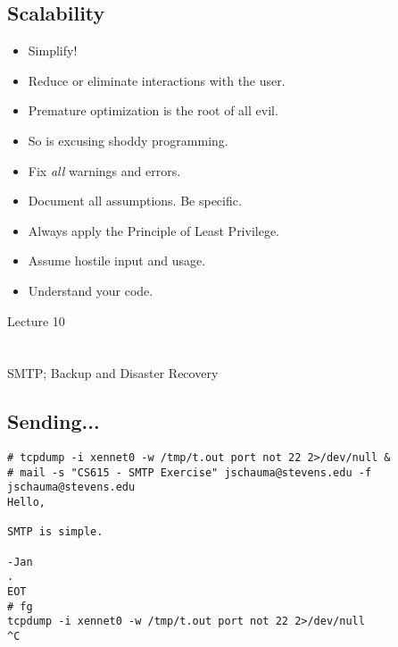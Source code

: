 \documentclass[xga]{xdvislides}
\begin{document}
\subsection{Scalability}
\begin{itemize}
	\item Simplify!
	\item Reduce or eliminate interactions with the user.
	\item Premature optimization is the root of all evil.
	\item So is excusing shoddy programming.
	\item Fix {\em all} warnings and errors.
	\item Document all assumptions.  Be specific.
	\item Always apply the Principle of Least Privilege.
	\item Assume hostile input and usage.
	\item Understand your code.
\end{itemize}


\newpage
\vspace*{\fill}
\begin{center}
    \Hugesize
        Lecture 10 \\ [1em]
    \hspace*{5mm}
    \blueline\\
    \hspace*{5mm}\\
	SMTP; Backup and Disaster Recovery
\end{center}
\vspace*{\fill}

\subsection{Sending...}
\begin{verbatim}
# tcpdump -i xennet0 -w /tmp/t.out port not 22 2>/dev/null &
# mail -s "CS615 - SMTP Exercise" jschauma@stevens.edu -f jschauma@stevens.edu
Hello,

SMTP is simple.

-Jan
.
EOT
# fg
tcpdump -i xennet0 -w /tmp/t.out port not 22 2>/dev/null
^C
\end{verbatim}
\end{document}
